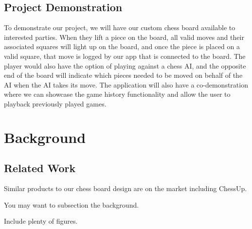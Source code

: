 \documentclass[11pt,journal]{IEEEtran}
\begin{document}
\subsection{Project Demonstration}
To demonstrate our project, we will have our custom chess board available to interested parties. When they lift a piece on the board, all valid moves and their associated squares will light up on the board, and once the piece is placed on a valid square, that move is logged by our app that is connected to the board. The player would also have the option of playing against a chess AI, and the opposite end of the board will indicate which pieces needed to be moved on behalf of the AI when the AI takes its move. The application will also have a co-demonstration where we can showcase the game history functionality and allow the user to playback previously played games.




\section{Background}

\subsection{Related Work}

Similar products to our chess board design are on the market including ChessUp. 

You may want to subsection the background.

Include plenty of figures.

\end{document}
